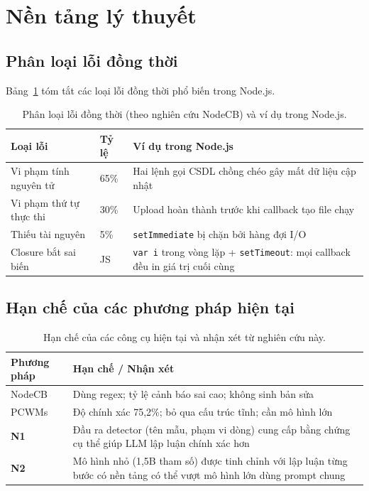 \documentclass[12pt]{article}
\begin{document}
\section{Nền tảng lý thuyết}
\label{sec:nentang}

\subsection{Phân loại lỗi đồng thời}

Bảng~\ref{tab:loailoi} tóm tắt các loại lỗi đồng thời phổ biến trong Node.js.

\begin{table}[ht]
  \centering
  \caption{Phân loại lỗi đồng thời (theo nghiên cứu NodeCB) và ví dụ trong Node.js.}
  \label{tab:loailoi}
  \begin{tabular}{@{}llp{7cm}@{}}
    \toprule
    \textbf{Loại lỗi} & \textbf{Tỷ lệ} & \textbf{Ví dụ trong Node.js} \\
    \midrule
    Vi phạm tính nguyên tử  & 65\% & Hai lệnh gọi CSDL chồng chéo gây mất dữ liệu cập nhật \\
    Vi phạm thứ tự thực thi & 30\% & Upload hoàn thành trước khi callback tạo file chạy \\
    Thiếu tài nguyên         & 5\%  & \texttt{setImmediate} bị chặn bởi hàng đợi I/O \\
    \midrule
    Closure bắt sai biến     & JS   & \texttt{var i} trong vòng lặp + \texttt{setTimeout}:
                                      mọi callback đều in giá trị cuối cùng \\
    \bottomrule
  \end{tabular}
\end{table}

\subsection{Hạn chế của các phương pháp hiện tại}

\begin{table}[ht]
  \centering
  \caption{Hạn chế của các công cụ hiện tại và nhận xét từ nghiên cứu này.}
  \label{tab:hanche}
  \begin{tabular}{@{}lp{10cm}@{}}
    \toprule
    \textbf{Phương pháp} & \textbf{Hạn chế / Nhận xét} \\
    \midrule
    NodeCB               & Dùng regex; tỷ lệ cảnh báo sai cao; không sinh bản sửa \\
    PCWMs                & Độ chính xác 75,2\%; bỏ qua cấu trúc tĩnh; cần mô hình lớn \\
    \midrule
    \textbf{N1}          & Đầu ra detector (tên mẫu, phạm vi dòng) cung cấp bằng chứng
                           cụ thể giúp LLM lập luận chính xác hơn \\
    \textbf{N2}          & Mô hình nhỏ (1,5B tham số) được tinh chỉnh với lập luận
                           từng bước có nền tảng có thể vượt mô hình lớn dùng prompt chung \\
    \bottomrule
  \end{tabular}
\end{table}
\end{document}
